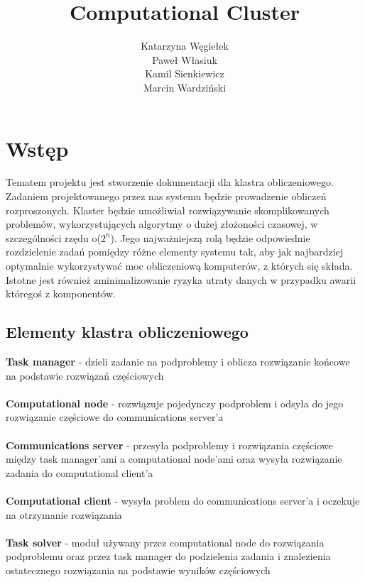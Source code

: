 \documentclass[12pt,a4paper,titlepage]{report}
\author{Katarzyna Węgiełek \\ Paweł Własiuk \\ Kamil Sienkiewicz\\ Marcin Wardziński}
\title{\textbf{Computational Cluster}}
\begin{document}
	\maketitle
	\tableofcontents

	\chapter{Wstęp}
	Tematem projektu jest stworzenie dokumentacji dla klastra obliczeniowego. Zadaniem projektowanego przez nas systemu będzie prowadzenie obliczeń rozproszonych. Klaster będzie umożliwiał rozwiązywanie skomplikowanych problemów, wykorzystujących algorytmy o dużej złożoności czasowej, w szczególności rzędu o($2^n$). Jego najważniejszą rolą będzie odpowiednie rozdzielenie zadań pomiędzy różne elementy systemu tak, aby jak najbardziej optymalnie wykorzystywać moc obliczeniową komputerów, z których się składa. Istotne jest również zminimalizowanie ryzyka utraty danych w przypadku awarii któregoś z komponentów.
	
	\section{Elementy klastra obliczeniowego}
	\textbf{Task manager} - dzieli zadanie na podproblemy i oblicza rozwiązanie końcowe na podstawie rozwiązań częściowych\\\\
\textbf{Computational node} - rozwiązuje pojedynczy podproblem i odsyła do jego rozwiązanie częściowe do communications server'a\\\\
\textbf{Communications server} - przesyła podproblemy i rozwiązania częściowe między task manager'ami a computational node'ami oraz wysyła rozwiązanie zadania do computational client'a\\\\
\textbf{Computational client} - wysyła problem do communications server'a i oczekuje na otrzymanie rozwiązania\\\\
\textbf{Task solver} - moduł używany przez computational node do rozwiązania podproblemu oraz przez task manager do podzielenia zadania i znalezienia ostatecznego rozwiązania na podstawie wyników częściowych\\
	
\end{document}
